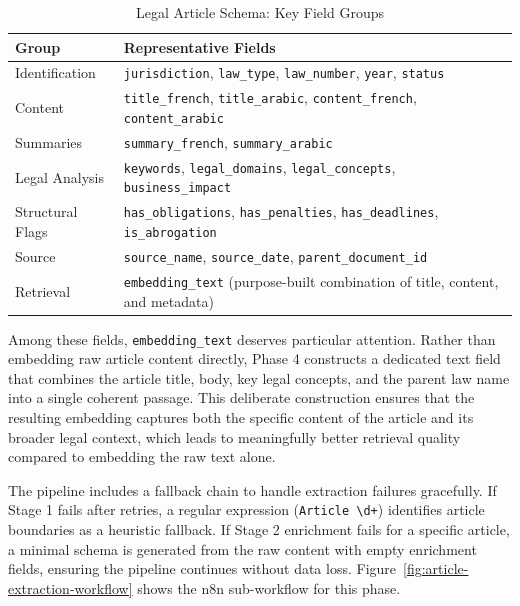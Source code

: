 \begin{table}[H]
\centering
\caption{Legal Article Schema: Key Field Groups}
\label{tab:article-schema}
\renewcommand{\arraystretch}{1.3}
\begin{tabular}{|p{3.5cm}|p{9cm}|}
\hline
\textbf{Group} & \textbf{Representative Fields} \\
\hline
Identification &
\texttt{jurisdiction}, \texttt{law\_type}, \texttt{law\_number}, \texttt{year}, \texttt{status} \\
\hline
Content &
\texttt{title\_french}, \texttt{title\_arabic}, \texttt{content\_french}, \texttt{content\_arabic} \\
\hline
Summaries &
\texttt{summary\_french}, \texttt{summary\_arabic} \\
\hline
Legal Analysis &
\texttt{keywords}, \texttt{legal\_domains}, \texttt{legal\_concepts}, \texttt{business\_impact} \\
\hline
Structural Flags &
\texttt{has\_obligations}, \texttt{has\_penalties}, \texttt{has\_deadlines}, \texttt{is\_abrogation} \\
\hline
Source &
\texttt{source\_name}, \texttt{source\_date}, \texttt{parent\_document\_id} \\
\hline
Retrieval &
\texttt{embedding\_text} (purpose-built combination of title, content, and metadata) \\
\hline
\end{tabular}
\end{table}

Among these fields, \texttt{embedding\_text} deserves particular attention. Rather than embedding raw article content directly, Phase 4 constructs a dedicated text field that combines the article title, body, key legal concepts, and the parent law name into a single coherent passage. This deliberate construction ensures that the resulting embedding captures both the specific content of the article and its broader legal context, which leads to meaningfully better retrieval quality compared to embedding the raw text alone.
\vspace{1em}

The pipeline includes a fallback chain to handle extraction failures gracefully. If Stage 1 fails after retries, a regular expression (\verb|Article \d+|) identifies article boundaries as a heuristic fallback. If Stage 2 enrichment fails for a specific article, a minimal schema is generated from the raw content with empty enrichment fields, ensuring the pipeline continues without data loss. Figure~\ref{fig:article-extraction-workflow} shows the n8n sub-workflow for this phase.

